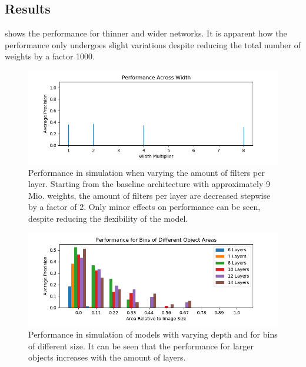 	
	
	\subsection{Results}
	
	 shows the performance for thinner and wider networks. It is apparent how the performance only undergoes slight variations despite reducing the total number of weights by a factor 1000. 
	
	
	\begin{figure}[hbtp]
		\centering
		\includegraphics[width=\textwidth]{fig/perf_width}
		\caption{Performance in simulation when varying the amount of filters per layer. Starting from the baseline architecture with approximately 9 Mio. weights, the amount of filters per layer are decreased stepwise by a factor of 2. Only minor effects on performance can be seen, despite reducing the flexibility of the model.}
		\label{fig:perf_width}
	\end{figure}
	
	\begin{figure}[hbtp]
		\centering
		\includegraphics[width=\textwidth]{fig/depth_ap_size}
		\caption{Performance in simulation of models with varying depth and for bins of different size. It can be seen that the performance for larger objects increases with the amount of layers.}
		\label{fig:depth_ap_size}
	\end{figure}
	
